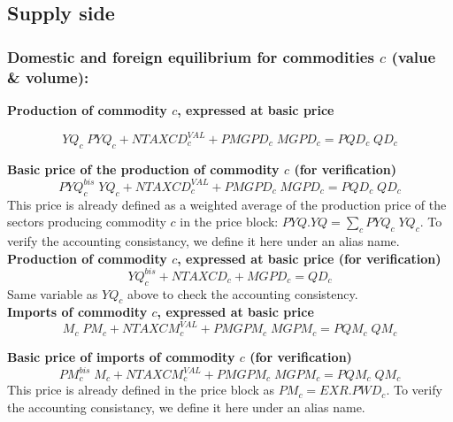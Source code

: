 \documentclass[12pt]{article}
\numberwithin{equation}{section}
\begin{document}
\newpage


\subsection{Supply side}





\subsubsection{Domestic and foreign equilibrium for commodities $c$ (value \& volume):}




\noindent \textbf{Production of commodity $c$, expressed at basic price} 

\begin{dmath}
YQ_{c} \; PYQ_{c} + NTAXCD^{VAL}_{c} + PMGPD_{c} \; MGPD_{c} = PQD_{c} \; QD_{c}
\label{SU.mdlYQ[c]}
\end{dmath}

\noindent \textbf{Basic price of the production of commodity $c$ (for verification)} 
\begin{dmath}
PYQ^{bis}_{c} \; YQ_{c} + NTAXCD^{VAL}_{c} + PMGPD_{c} \; MGPD_{c} = PQD_{c} \; QD_{c}
\label{SU.mdlPYQbis[c]}
\end{dmath}
 This price is already defined as a weighted average of the production price of the sectors producing commodity $c$ in the price block: $PYQ . YQ = \sum_{c} PYQ_{c} \; YQ_{c}$. To verify the accounting consistancy, we define it here under an alias name. \\

\noindent \textbf{Production of commodity $c$, expressed at basic price (for verification)} 
\begin{dmath}
YQ^{bis}_{c} + NTAXCD_{c} + MGPD_{c} = QD_{c}
\label{SU.mdlYQbis[c]}
\end{dmath}
Same variable as $YQ_{c}$ above to check the accounting consistency. \\

\noindent \textbf{Imports of commodity $c$, expressed at basic price} 
\begin{dmath}
M_{c} \; PM_{c} + NTAXCM^{VAL}_{c} + PMGPM_{c} \; MGPM_{c} = PQM_{c} \; QM_{c}
\label{SU.mdlM[c]}
\end{dmath}

\noindent \textbf{Basic price of imports of commodity $c$ (for verification)} 
\begin{dmath}
PM^{bis}_{c} \; M_{c} + NTAXCM^{VAL}_{c} + PMGPM_{c} \; MGPM_{c} = PQM_{c} \; QM_{c}
\label{SU.mdlPMbis[c]}
\end{dmath}
 This price is already defined in the price block as $PM_{c} = EXR . PWD_{c}$. To verify the accounting consistancy, we define it here under an alias name. \\
\end{document}
